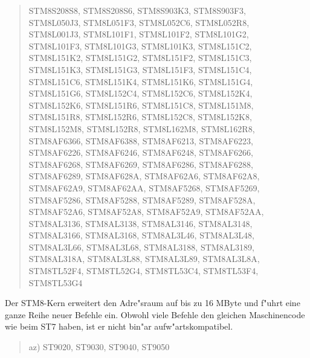 \documentclass[12pt,a4paper,twoside]{report}
\begin{document}
\begin{quote}
    STM8S208S8, STM8S208S6, STM8S903K3, STM8S903F3,\\
    STM8L050J3, STM8L051F3, STM8L052C6, STM8L052R8,\\
    STM8L001J3, STM8L101F1, STM8L101F2, STM8L101G2,\\
    STM8L101F3, STM8L101G3, STM8L101K3, STM8L151C2,\\
    STM8L151K2, STM8L151G2, STM8L151F2, STM8L151C3,\\
    STM8L151K3, STM8L151G3, STM8L151F3, STM8L151C4,\\
    STM8L151C6, STM8L151K4, STM8L151K6, STM8L151G4,\\
    STM8L151G6, STM8L152C4, STM8L152C6, STM8L152K4,\\
    STM8L152K6, STM8L151R6, STM8L151C8, STM8L151M8,\\
    STM8L151R8, STM8L152R6, STM8L152C8, STM8L152K8,\\
    STM8L152M8, STM8L152R8, STM8L162M8, STM8L162R8,\\
    STM8AF6366, STM8AF6388, STM8AF6213, STM8AF6223,\\
    STM8AF6226, STM8AF6246, STM8AF6248, STM8AF6266,\\
    STM8AF6268, STM8AF6269, STM8AF6286, STM8AF6288,\\
    STM8AF6289, STM8AF628A, STM8AF62A6, STM8AF62A8,\\
    STM8AF62A9, STM8AF62AA, STM8AF5268, STM8AF5269,\\
    STM8AF5286, STM8AF5288, STM8AF5289, STM8AF528A,\\
    STM8AF52A6, STM8AF52A8, STM8AF52A9, STM8AF52AA,\\
    STM8AL3136, STM8AL3138, STM8AL3146, STM8AL3148,\\
    STM8AL3166, STM8AL3168, STM8AL3L46, STM8AL3L48,\\
    STM8AL3L66, STM8AL3L68, STM8AL3188, STM8AL3189,\\
    STM8AL318A, STM8AL3L88, STM8AL3L89, STM8AL3L8A,\\
    STM8TL52F4, STM8TL52G4, STM8TL53C4, STM8TL53F4,\\
    STM8TL53G4
\end{quote}
Der STM8-Kern erweitert den Adre"sraum auf bis zu 16 MByte und f"uhrt
eine ganze Reihe neuer Befehle ein.  Obwohl viele Befehle den
gleichen Maschinencode wie beim ST7 haben, ist er nicht bin"ar
aufw"artskompatibel.
\begin{quote}
az) ST9020, ST9030, ST9040, ST9050
\end{quote}
\end{document}
